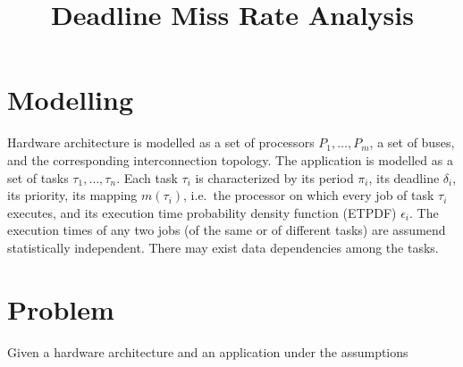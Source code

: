 \documentclass[pdftex,10pt,a4paper]{scrartcl}
\title{Deadline Miss Rate Analysis}
\date{\vspace{-5ex}}
\begin{document}
\maketitle

\section{Modelling}

Hardware architecture is modelled as a set of processors $P_1, \ldots, P_m$, a set of buses, and the corresponding interconnection topology.
The application is modelled as a set of tasks $\tau_1, \ldots, \tau_n$.
Each task $\tau_i$ is characterized by its period $\pi_i$, its deadline $\delta_i$, its priority, its mapping $m(\tau_i)$, i.e.\ the processor on which every job of task $\tau_i$ executes, and its execution time probability density function (ETPDF) $\epsilon_i$.
The execution times of any two jobs (of the same or of different tasks) are assumend statistically independent.
There may exist data dependencies among the tasks.

\section{Problem}

Given a hardware architecture and an application under the assumptions
\end{document}
